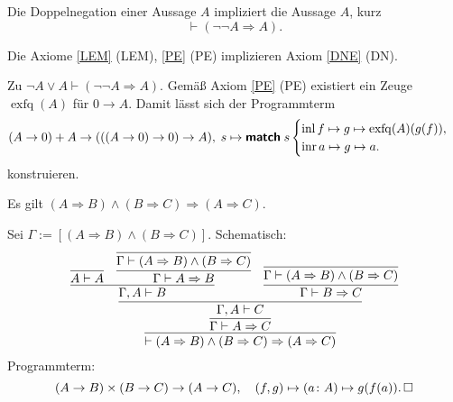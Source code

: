 \begin{Axiom}\label{DNE}\newlinefirst
Die Doppelnegation einer Aussage $A$ impliziert die Aussage $A$, kurz
\[\vdash (\neg\neg A\Rightarrow A).\]
\end{Axiom}

\begin{Satz} Die Axiome \ref{LEM} (LEM), \ref{PE} (PE)
implizieren Axiom \ref{DNE} (DN).
\end{Satz}
\begin{Beweis}
Zu $\neg A \lor A\vdash (\neg\neg A \Rightarrow A)$.
Gemäß Axiom \ref{PE} (PE) existiert ein Zeuge $\operatorname{exfq}(A)$
für $0\to A$. Damit lässt sich der Programmterm
\[(A\to 0) + A \to (((A\to 0)\to 0)\to A),\;
s\mapsto\text{{\normalfont\sffamily\bfseries match}}\; s\begin{cases}
\operatorname{inl} f\mapsto g\mapsto \operatorname{exfq}(A)(g(f)),\\
\operatorname{inr} a\mapsto g\mapsto a.
\end{cases}\]
konstruieren.\;\qedsymbol
\end{Beweis}

\newpage

\begin{Satz}\newlinefirst
Es gilt
$(A\Rightarrow B) \land (B\Rightarrow C) \Rightarrow (A\Rightarrow C)$.
\end{Satz}
\begin{Beweis}[Beweis]
Sei $\Gamma:=[(A\Rightarrow B) \land (B\Rightarrow C)]$. Schematisch:
\[
\infer{\vdash (A\Rightarrow B) \land (B\Rightarrow C) \Rightarrow (A\Rightarrow C)}{
  \infer{\Gamma\vdash A\Rightarrow C}{
    \infer{\Gamma,A\vdash C}{
     \infer{\Gamma,A\vdash B}{\infer{A\vdash A}{}
     & \infer{\Gamma\vdash A\Rightarrow B}{
         \infer{\Gamma\vdash (A\Rightarrow B)\land (B\Rightarrow C)}{}}}
     & \infer{\Gamma\vdash B\Rightarrow C}{
         \infer{\Gamma\vdash (A\Rightarrow B)\land (B\Rightarrow C)}{}}}}}
\]
Programmterm:
\[(A\to B)\times (B\to C)\to (A\to C),\quad
(f, g)\mapsto (a\colon A)\mapsto g(f(a)).\,\square\]
\end{Beweis}

